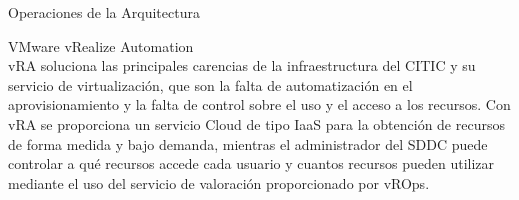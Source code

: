 \begin{subsection}{Operaciones de la Arquitectura}
\begin{subsubsection}{VMware vRealize Automation}
        \\
        vRA soluciona las principales carencias de la infraestructura del CITIC y su servicio de virtualización, que son la falta de automatización en el aprovisionamiento y la falta de control sobre el uso y el acceso a los recursos. Con vRA se proporciona un servicio Cloud de tipo IaaS para la obtención de recursos de forma medida y bajo demanda, mientras el administrador del SDDC puede controlar a qué recursos accede cada usuario y cuantos recursos pueden utilizar mediante el uso del servicio de valoración proporcionado por vROps.

\end{subsubsection}
\end{subsection}
